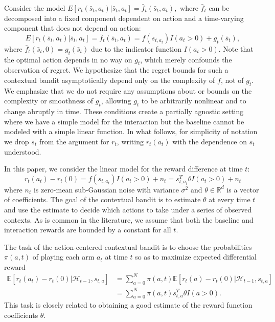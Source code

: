 \documentclass{article}
\begin{document}
Consider the model %
$%
E[r_t(\bar{s}_t,a_t) | \bar{s}_t,a_t] = \bar{f}_t(\bar{s}_t,a_t), 
$ %
where $\bar{f}_t$ can be decomposed into a fixed component dependent on action and a time-varying component that does not depend on action:
\[
E[r_t(\bar{s}_t,a_t) | \bar{s}_t,a_t] =\bar{f}_t(\bar{s}_t,a_t) = f(s_{t,a_t}) I(a_t > 0) + g_t(\bar{s}_t),
\]
where $\bar{f}_t(\bar{s}_t,0) = g_t(\bar{s}_t)$ due to the indicator function $I(a_t > 0)$. Note that the optimal action depends in no way on $g_t$, which merely confounds the observation of regret. We hypothesize that the regret bounds for such a contextual bandit asymptotically depend only on the complexity of $f$, not of $g_t$. We emphasize that we do not require any assumptions about or bounds on the complexity or smoothness of $g_t$, allowing $g_t$ to be arbitrarily nonlinear and to change abruptly in time. These conditions create a partially agnostic setting where we have a simple model for the interaction but the baseline cannot be modeled with a simple linear function. In what follows, for simplicity of notation we drop $\bar{s}_t$ from the argument for $r_t$, writing $r_t(a_t)$ with the dependence on $\bar{s}_t$ understood.

In this paper, we consider the linear model for the reward difference at time $t$:
\begin{equation}\label{eq:reward}
r_t(a_t) - r_t(0) = f(s_{t,a_t}) I(a_t > 0) + n_t = s_{t,a_t}^T \theta I(a_t > 0) + n_t 
\end{equation}
where $n_t$ is zero-mean sub-Gaussian noise with variance $\sigma^2$ and $\theta \in \mathbb{R}^d$ is a vector of coefficients. The goal of the contextual bandit is to estimate $\theta$ at every time $t$ and use the estimate to decide which actions to take under a series of observed contexts. As is common in the literature, we assume that both the baseline and interaction rewards are bounded by a constant for all $t$.


The task of the action-centered contextual bandit is to choose the probabilities $\pi(a,t)$ of playing each arm $a_t$ at time $t$ so as to maximize expected differential reward 
\begin{align}\label{eq:rewardPol}
\mathbb{E}[r_t(a_t)-r_t(0)|\mathcal{H}_{t-1}, s_{t,a}] &= \sum\nolimits_{a = 0}^N \pi(a,t) \mathbb{E}[r_t(a) - r_t(0)|\mathcal{H}_{t-1}, s_{t,a}] \\\nonumber
&= \sum\nolimits_{a = 0}^N \pi(a,t) s_{t,a}^T \theta I(a> 0).
\end{align}
This task is closely related to obtaining a good estimate of the reward function coefficients $\theta$. %
\end{document}
